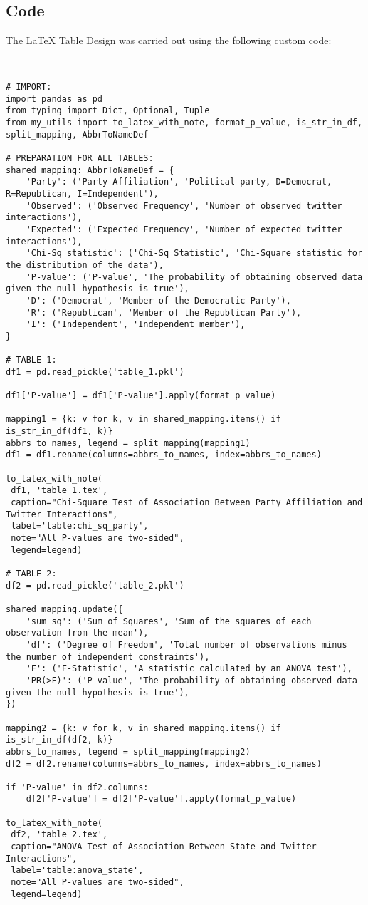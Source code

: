 \documentclass[11pt]{article}
\begin{document}
\subsection{{Code}}
The LaTeX Table Design was carried out using the following custom code:

\begin{verbatim}


# IMPORT:
import pandas as pd
from typing import Dict, Optional, Tuple
from my_utils import to_latex_with_note, format_p_value, is_str_in_df, split_mapping, AbbrToNameDef

# PREPARATION FOR ALL TABLES:
shared_mapping: AbbrToNameDef = {
    'Party': ('Party Affiliation', 'Political party, D=Democrat, R=Republican, I=Independent'),
    'Observed': ('Observed Frequency', 'Number of observed twitter interactions'),
    'Expected': ('Expected Frequency', 'Number of expected twitter interactions'),
    'Chi-Sq statistic': ('Chi-Sq Statistic', 'Chi-Square statistic for the distribution of the data'),
    'P-value': ('P-value', 'The probability of obtaining observed data given the null hypothesis is true'),
    'D': ('Democrat', 'Member of the Democratic Party'),
    'R': ('Republican', 'Member of the Republican Party'),
    'I': ('Independent', 'Independent member'),
}

# TABLE 1:
df1 = pd.read_pickle('table_1.pkl')

df1['P-value'] = df1['P-value'].apply(format_p_value)

mapping1 = {k: v for k, v in shared_mapping.items() if is_str_in_df(df1, k)}
abbrs_to_names, legend = split_mapping(mapping1)
df1 = df1.rename(columns=abbrs_to_names, index=abbrs_to_names)

to_latex_with_note(
 df1, 'table_1.tex',
 caption="Chi-Square Test of Association Between Party Affiliation and Twitter Interactions", 
 label='table:chi_sq_party',
 note="All P-values are two-sided",
 legend=legend)

# TABLE 2:
df2 = pd.read_pickle('table_2.pkl')

shared_mapping.update({
    'sum_sq': ('Sum of Squares', 'Sum of the squares of each observation from the mean'),
    'df': ('Degree of Freedom', 'Total number of observations minus the number of independent constraints'),
    'F': ('F-Statistic', 'A statistic calculated by an ANOVA test'),
    'PR(>F)': ('P-value', 'The probability of obtaining observed data given the null hypothesis is true'),
})

mapping2 = {k: v for k, v in shared_mapping.items() if is_str_in_df(df2, k)}
abbrs_to_names, legend = split_mapping(mapping2)
df2 = df2.rename(columns=abbrs_to_names, index=abbrs_to_names)

if 'P-value' in df2.columns:
    df2['P-value'] = df2['P-value'].apply(format_p_value)

to_latex_with_note(
 df2, 'table_2.tex',
 caption="ANOVA Test of Association Between State and Twitter Interactions", 
 label='table:anova_state',
 note="All P-values are two-sided",
 legend=legend)
 

\end{verbatim}
\end{document}
